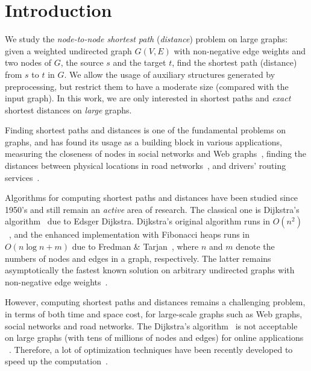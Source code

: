 \section{Introduction}
\label{sec-intro}


We study the {\em node-to-node shortest path} ({\em distance}) problem on large graphs: given a weighted undirected graph $G(V, E)$ with non-negative edge weights and two nodes of $G$, the source $s$ and the target $t$, find the shortest path (distance) from $s$ to $t$ in $G$. We allow the usage of auxiliary structures  generated by preprocessing, but restrict them to have a moderate size (compared with the input graph).  In this work, we are only interested in shortest paths and {\em exact}  shortest distances on {\em large} graphs.

Finding shortest  paths and distances is one of the fundamental problems on graphs, and has found its usage as a building block in various applications, \eg measuring the closeness of nodes in social networks and Web graphs~\cite{LappasLT09,PotamiasBCG09,SarmaGNP10}, finding the distances between physical locations in road networks~\cite{WuXDCZZ12}, and drivers' routing services~\cite{DLiuYK13}.

Algorithms for computing shortest  paths and distances have been studied since 1950's and still remain an {\em active} area of research. The classical one is Dijkstra's algorithm~\cite{CormenLRS01} due to Edsger Dijkstra. Dijkstra's original algorithm runs in $O(n^2)$~\cite{Dijkstra59}, and the enhanced implementation with Fibonacci heaps runs in $O(n\log n + m)$ due to Fredman \& Tarjan~\cite{FredmanT84}, where $n$ and $m$ denote the numbers of nodes and edges in a graph, respectively. The latter remains asymptotically the fastest known solution on arbitrary undirected graphs with non-negative edge weights~\cite{ThorupZ05}.

However, computing shortest  paths and distances remains a challenging problem, in terms of both time and space cost, for large-scale graphs such as Web graphs, social networks and road networks. The Dijkstra's algorithm~\cite{FredmanT84} is not acceptable on large graphs (\eg with tens of millions of nodes and edges) for online applications ~\cite{PotamiasBCG09}. Therefore, a lot of optimization techniques have been recently developed to speed up the computation~\cite{PotamiasBCG09,SarmaGNP10,WuXDCZZ12,LubyR89,GeisbergerSSD08,Wei10,SankaranarayananSA09,SandersS05,ChengKCC12}.


